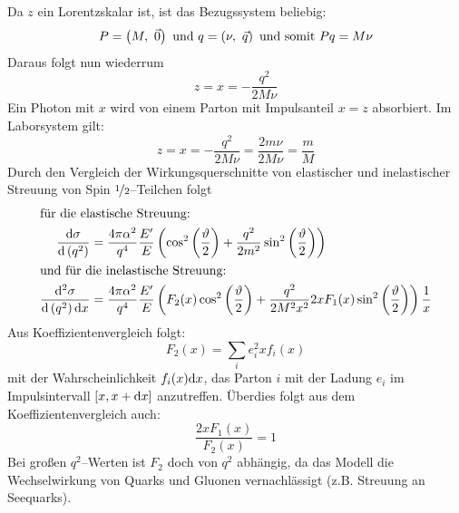 \documentclass[Ex4_Zusammenfassung.tex]{subfiles}
\begin{document}
Da $z$ ein Lorentzskalar ist, ist das Bezugssystem beliebig:
\begin{equation*}
	P = \lp M,\ \vec{0} \rp \text{ und } q=\lp \nu,\ \vec{q} \rp \text{ und somit } Pq=M\nu
\end{equation*}
Daraus folgt nun wiederrum 
\begin{equation}
	z=x=-\frac{q^2}{2M\nu}
\end{equation}
Ein Photon mit $x$ wird von einem Parton mit Impulsanteil $x=z$ absorbiert. Im Laborsystem gilt: 
\begin{equation}
	z=x=-\frac{q^2}{2M\nu}=\frac{2m\nu}{2M\nu}=\frac{m}{M}
\end{equation}
Durch den Vergleich der Wirkungsquerschnitte von elastischer und inelastischer Streuung von Spin $\nicefrac{1}{2}$--Teilchen folgt
\begin{align}
	\intertext{für die elastische Streuung:}
	\frac{\mathrm{d} \sigma}{\mathrm{d} \left( q^2\right)} &= \frac{4 \pi \alpha^2}{q^4} \frac{E^\prime}{E} \left( \cos^2\left( \frac{\vartheta}{2}\right) + \frac{q^2}{2m^2} \sin^2\left( \frac{\vartheta}{2}\right) \right)\\
	\intertext{und für die inelastische Streuung:}
	\frac{\mathrm{d} ^2 \sigma}{\mathrm{d} \left( q^2\right) \mathrm{d} x} &= \frac{4 \pi \alpha^2}{q^4} \frac{E^\prime}{E} \left( F_2 (x) \cos^2 \left( \frac{\vartheta}{2} \right)+ \frac{q^2}{2M^2x^2} 2xF_1(x) \sin^2 \left( \frac{\vartheta}{2} \right) \right) \frac{1}{x}
\end{align}
Aus Koeffizientenvergleich folgt:
\begin{equation}
	F_2(x) = \sum_i e_i^2 x f_i(x)
\end{equation}
mit der Wahrscheinlichkeit $f_i(x)\mathrm{d} x$, das Parton $i$ mit der Ladung $e_i$ im Impulsintervall $\left[ x,x+\mathrm{d} x \right]$ anzutreffen. Überdies folgt aus dem Koeffizientenvergleich auch:
\begin{equation}
	\frac{2xF_1(x)}{F_2(x)}=1
\end{equation}
Bei großen $q^2$--Werten ist $F_2$ doch von $q^2$ abhängig, da das Modell die Wechselwirkung von Quarks und Gluonen vernachlässigt (z.B. Streuung an Seequarks).
\end{document}
